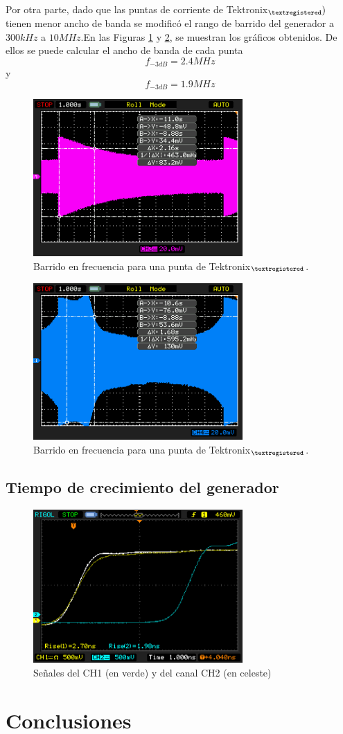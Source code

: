 \documentclass[a4paper,10pt]{article}
\begin{document}
		Por otra parte, dado que las puntas de corriente de  Tektronix$_{\textregistered} )$ tienen menor ancho de banda se modific\'o el rango de barrido del generador a $300kHz$ a $10MHz$.En las Figuras \ref{img006} y \ref{img007}, se muestran los gr\'aficos obtenidos. De ellos se puede calcular el ancho de banda de cada punta
		$$f_{-3dB}=2.4MHz$$ y $$f_{-3dB}=1.9MHz$$
		\begin{figure}[!htb]
			\centering
			\includegraphics[width=8cm]{Imagenes/Mediciones instrumentos/NewFile7.png}
			\caption{Barrido en frecuencia para una punta de Tektronix$_{\textregistered}$.} \label{img006}
		\end{figure}		
	
		\begin{figure}[!htb]
			\centering
			\includegraphics[width=8cm]{Imagenes/Mediciones instrumentos/NewFile8.png}
			\caption{Barrido en frecuencia para una punta de Tektronix$_{\textregistered}$.} \label{img007}
		\end{figure}
		
		\subsection{Tiempo de crecimiento del generador}
		\begin{figure}[!htb]
			\centering
			\includegraphics[width=8cm]{Imagenes/Mediciones instrumentos/NewFile10.png}
			\caption{Se\~nales del CH1 (en verde) y del canal CH2 (en celeste)} \label{img008}
		\end{figure}
		
	\section{Conclusiones}
\end{document}
